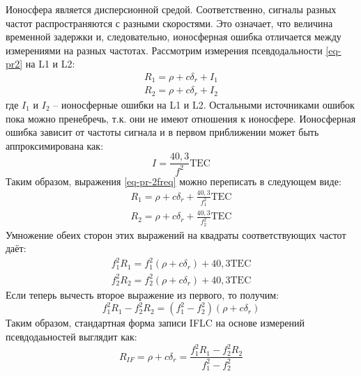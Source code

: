 Ионосфера является дисперсионной средой.
Соответственно, сигналы разных частот распространяются с разными скоростями.
Это означает, что величина временной задержки и, следовательно, ионосферная ошибка отличается между измерениями на разных частотах.
Рассмотрим измерения псевдодальности \eqref{eq-pr2} на L1 и L2:
\begin{equation}
\label{eq-pr-2freq}
\begin{aligned}
R_1=\rho+c\delta_r+I_1 \\
R_2=\rho+c\delta_r+I_2    
\end{aligned}
\end{equation}
где 
$I_1$ и $I_2$ -- ионосферные ошибки на L1 и L2.
Остальными источниками ошибок пока можно пренебречь, т.к. они не имеют отношения к ионосфере.
Ионосферная ошибка зависит от частоты сигнала и в первом приближении может быть аппроксимирована как:
\begin{equation}
\label{eq-ion-error}
I=\frac{40,3}{f^2}\text{TEC}    
\end{equation}
Таким образом, выражения \eqref{eq-pr-2freq} можно переписать в следующем виде:
\begin{equation}
\begin{aligned}
R_1=\rho+c\delta_r+\frac{40,3}{f_1^2}\text{TEC} \\
R_2=\rho+c\delta_r+\frac{40,3}{f_2^2}\text{TEC}      
\end{aligned}
\end{equation}
Умножение обеих сторон этих выражений на квадраты соответствующих частот даёт:
\begin{equation}
\begin{aligned}
f_1^2R_1=f_1^2(\rho+c\delta_r)+40,3\text{TEC} \\
f_2^2R_2=f_2^2(\rho+c\delta_r)+40,3\text{TEC}      
\end{aligned}
\end{equation}
Если теперь вычесть второе выражение из первого, то получим:
\begin{equation}
f_1^2R_1-f_2^2R_2=(f_1^2-f_2^2)(\rho+c\delta_r)    
\end{equation}
Таким образом, стандартная форма записи IFLC на основе измерений псевдодаьностей выглядит как:
\begin{equation}
R_{IF}=\rho+c\delta_r=\frac{f_1^2R_1-f_2^2R_2}{f_1^2-f_2^2}    
\end{equation}

